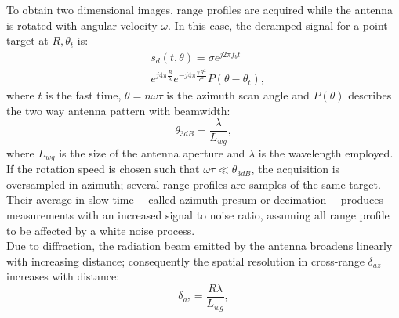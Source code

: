 To obtain two dimensional images, range profiles are acquired while the antenna is rotated with angular velocity $\omega$. 
In this case, the deramped signal for a point target at $R,\theta_t$ is:
\begin{equation}\label{eq:signal_model}
	\begin{aligned}
	& s_{d}\left(t,\theta\right) = \sigma e^{j 2 \pi f_b t}   \\
	& e^{j 4 \pi \frac{R}{\lambda}}  e^{-j 4 \pi \frac{\gamma R^2}{c^2}} P\left(\theta - \theta_t\right),
	\end{aligned}
\end{equation} 
where $t$ is the fast time,  $\theta = n \omega \tau$ is the azimuth scan angle and $P\left(\theta\right)$ describes the two way antenna pattern with beamwidth:
\begin{equation}\label{eq:azimuth_resolution}
	\theta_{3dB} = \frac{\lambda}{L_{wg}},
\end{equation}
where $L_{wg}$ is the size of the antenna aperture and $\lambda$ is the wavelength employed.
If the rotation speed is chosen such that $\omega \tau \ll \theta_{3dB}$, the acquisition is oversampled in azimuth; several range profiles are samples of the same target. Their average in slow time  ---called azimuth presum or decimation--- produces measurements with an increased signal to noise ratio, assuming all range profile to be affected by a white noise process.\\
Due to diffraction, the radiation beam emitted by the antenna broadens linearly with increasing distance; consequently the spatial resolution in cross-range $\delta_{az}$ increases with distance:
\begin{equation}\label{eq:azimuth_ground_resolution}
	\delta_{az} = \frac{R \lambda}{L_{wg}},
\end{equation}
